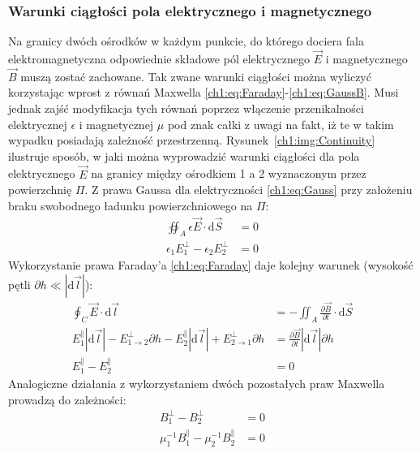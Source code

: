 \subsubsection{Warunki ciągłości pola elektrycznego i magnetycznego }
Na granicy dwóch ośrodków w każdym punkcie, do którego dociera fala elektromagnetyczna odpowiednie składowe pól elektrycznego $\vec{E}$ i magnetycznego $\vec{B}$ muszą zostać zachowane. Tak zwane warunki ciągłości można wyliczyć korzystając wprost z równań Maxwella \eqref{ch1:eq:Faraday}-\eqref{ch1:eq:GaussB}. Musi jednak zajść modyfikacja tych równań poprzez włączenie przenikalności elektrycznej $\epsilon$ i magnetycznej $\mu$ pod znak całki z uwagi na fakt, iż te w takim wypadku posiadają zależność przestrzenną.
Rysunek~\ref{ch1:img:Continuity} ilustruje sposób, w jaki można wyprowadzić warunki ciągłości dla pola elektrycznego $\vec{E}$ na granicy między ośrodkiem 1 a 2 wyznaczonym przez powierzchnię $\Pi$. Z prawa Gaussa dla elektryczności \eqref{ch1:eq:Gauss} przy założeniu braku swobodnego ładunku powierzchniowego na $\Pi$:
\begin{align}
\oiint_A \epsilon\vec{E}\cdot\mathrm{d}\vec{S} &= 0 \nonumber\\
\epsilon_1E_1^\perp - \epsilon_2E_2^\perp &= 0 
\end{align}
Wykorzystanie prawa Faraday'a \eqref{ch1:eq:Faraday} daje kolejny warunek (wysokość pętli $\partial h \ll |\mathrm{d}\vec{l}|$):
\begin{align}
\oint_C\vec{E}\cdot \mathrm{d}\vec{l} &= -\iint_A\frac{\partial\vec{B}}{\partial t}\cdot \mathrm{d}\vec{S}\nonumber\\
E_1^\parallel|\mathrm{d}\vec{l}| - E_{1\rightarrow 2}^\perp\partial h - E_2^\parallel|\mathrm{d}\vec{l}| + E_{2\rightarrow 1}^\perp\partial h &= \frac{\partial\vec{B}}{\partial t}|\mathrm{d}\vec{l}|\partial h\nonumber\\
\label{ch1:eq:EParallelContinuity}
E_1^\parallel - E_2^\parallel &= 0
\end{align}
Analogiczne działania z wykorzystaniem dwóch pozostałych praw Maxwella prowadzą do zależności:
\begin{align}
B_1^\perp - B_2^\perp &= 0\\
\label{ch1:eq:BParallelContinuity}
\mu_1^{-1}B_1^\parallel - \mu_2^{-1}B_2^\parallel &= 0
\end{align}
